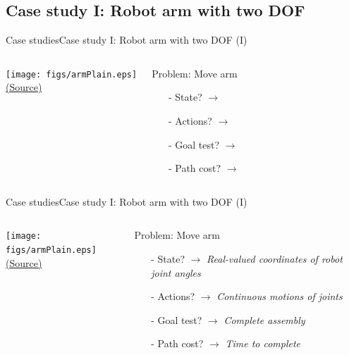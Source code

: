 \documentclass[10pt,compress]{beamer} %
\begin{document}

\subsection{Case study I: Robot arm with two DOF}
\begin{frame}{Case studies}{Case study I: Robot arm with two DOF (I)}
       \begin{columns}
	            \centering \texttt{[image: figs/armPlain.eps]}\\
	            \tiny{\href{http://aima.cs.berkeley.edu/index.html}{(Source)}}
                \begin{exampleblock}{Problem: Move arm}
                    \begin{itemize}
                    \item[-] State? $\rightarrow$ 
                    \item[-] Actions? $\rightarrow$ 
                    \item[-] Goal test? $\rightarrow$ 
                    \item[-] Path cost? $\rightarrow$
                    \end{itemize}
                \end{exampleblock}
      \end{columns}
\end{frame}

\begin{frame}{Case studies}{Case study I: Robot arm with two DOF (I)}
       \begin{columns}
	            \centering \texttt{[image: figs/armPlain.eps]}\\
	            \tiny{\href{http://aima.cs.berkeley.edu/index.html}{(Source)}}
                \begin{exampleblock}{Problem: Move arm}
                    \begin{itemize}
                    \item[-] State? $\rightarrow$ \textit{Real-valued coordinates of robot joint angles}
                    \item[-] Actions? $\rightarrow$ \textit{Continuous motions of joints}
                    \item[-] Goal test? $\rightarrow$ \textit{Complete assembly}
                    \item[-] Path cost? $\rightarrow$ \textit{Time to complete}
                    \end{itemize}
                \end{exampleblock}
      \end{columns}
\end{frame}
\end{document}

